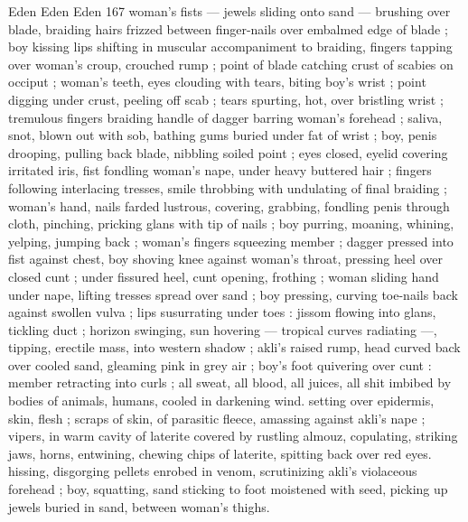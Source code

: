 Eden Eden Eden 167
woman's fists — jewels sliding onto sand — brushing over blade,
braiding hairs frizzed between finger-nails over embalmed edge of
blade ; boy kissing lips shifting in muscular accompaniment to
braiding, fingers tapping over woman's croup, crouched rump ; point
of blade catching crust of scabies on occiput ; woman's teeth, eyes
clouding with tears, biting boy's wrist ; point digging under crust,
peeling off scab ; tears spurting, hot, over bristling wrist ; tremulous
fingers braiding handle of dagger barring woman's forehead ; saliva,
snot, blown out with sob, bathing gums buried under fat of wrist ;
boy, penis drooping, pulling back blade, nibbling soiled point ; eyes
closed, eyelid covering irritated iris, fist fondling woman's nape,
under heavy buttered hair ; fingers following interlacing tresses,
smile throbbing with undulating of final braiding ; woman's hand,
nails farded lustrous, covering, grabbing, fondling penis through
cloth, pinching, pricking glans with tip of nails ; boy purring,
moaning, whining, yelping, jumping back ; woman's fingers
squeezing member ; dagger pressed into fist against chest, boy
shoving knee against woman's throat, pressing heel over closed cunt
; under fissured heel, cunt opening, frothing ; woman sliding hand
under nape, lifting tresses spread over sand ; boy pressing, curving
toe-nails back against swollen vulva ; lips susurrating under toes :
jissom flowing into glans, tickling duct ; horizon swinging, sun
hovering — tropical curves radiating —, tipping, erectile mass, into
western shadow ; akli’s raised rump, head curved back over cooled
sand, gleaming pink in grey air ; boy's foot quivering over cunt :
member retracting into curls ; all sweat, all blood, all juices, all shit
imbibed by bodies of animals, humans, cooled in darkening wind.
setting over epidermis, skin, flesh ; scraps of skin, of parasitic
fleece, amassing against akli's nape ; vipers, in warm cavity of
laterite covered by rustling almouz, copulating, striking jaws, horns,
entwining, chewing chips of laterite, spitting back over red eyes.
hissing, disgorging pellets enrobed in venom, scrutinizing akli's
violaceous forehead ; boy, squatting, sand sticking to foot moistened
with seed, picking up jewels buried in sand, between woman's thighs.

